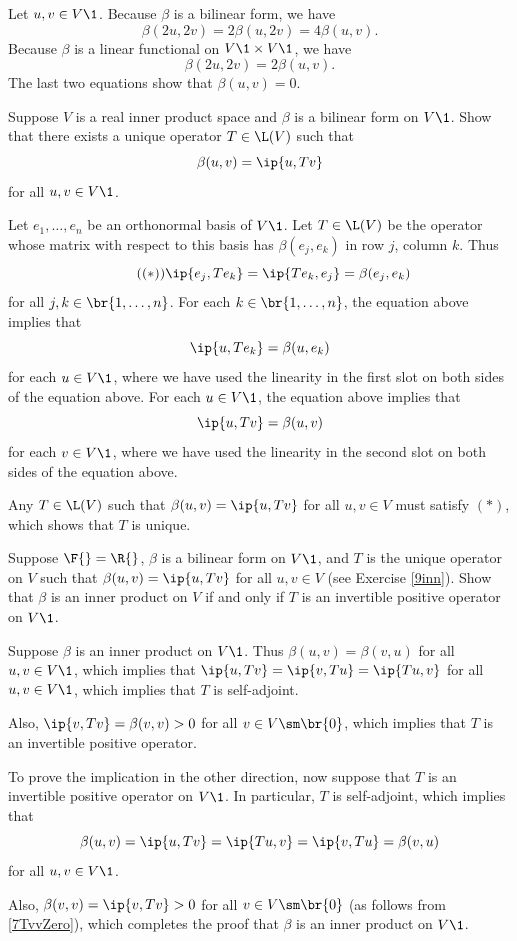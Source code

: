 \begin{Solution}
Let $u, v \in V\1$. Because $\beta$ is a bilinear form, we have
\[
\beta(2u, 2v) = 2 \beta(u, 2v) = 4 \beta(u, v).
\]
Because $\beta$ is a linear functional on $V\1 \times V\1$, we have
\[
\beta(2u, 2v) = 2 \beta(u, v).
\]
The last two equations show that $\beta(u, v) = 0$.
\end{Solution}

\exercise
Suppose $V$ is a real inner product space and $\beta$ is a bilinear form on $V\1$. Show that there exists a unique operator $T \in \L(V)$ such that\label{9inn}
\[
\beta(u, v) = \ip{u,Tv}
\]
for all $u, v \in V\1$.

\begin{Solution}
Let $e_1, \ldots, e_n$ be an orthonormal basis of $V\1$. Let $T \in \L(V)$ be the operator whose matrix with respect to this basis has $\beta(e_j, e_k)$ in row $j$, column $k$. Thus
\[ \tag{$(*)$}
\ip{e_j, Te_k} = \ip{Te_k, e_j} = \beta(e_j, e_k)
\]
for all $j, k \in \br{1, \ldots, n}$. For each $k \in \br{1, \ldots, n}$, the equation above implies that
\[
\ip{u, Te_k} = \beta(u, e_k)
\]
for each $u \in V\1$, where we have used the linearity in the first slot on both sides of the equation above. For each $u \in V\1$, the equation above implies that
\[
\ip{u, Tv} = \beta(u,v)
\]
for each $v \in V\1$, where we have used the linearity in the second slot on both sides of the equation above.

Any $T \in \L(V)$ such that $\beta(u, v) = \ip{u,Tv}$ for all $u,v \in V$ must satisfy $(*)$, which shows that $T$ is unique.
\end{Solution}

\exercise
Suppose $\F{} = \R{}$, $\beta$ is a bilinear form on $V\1$, and $T$ is the unique operator on $V$ such that $\beta(u,v) = \ip{u, Tv}$ for all $u, v \in V$ (see Exercise \ref{9inn}). Show that $\beta$ is an inner product on $V$ if and only if $T$ is an invertible positive operator on $V\1$.

\begin{Solution}
Suppose $\beta$ is an inner product on $V\1$. Thus $\beta(u,v) = \beta(v,u)$ for all $u, v \in V\1$, which implies that
$\ip{u,Tv} = \ip{v, Tu} = \ip{Tu,v}$ for all $u, v \in V\1$, which implies that $T$ is self-adjoint.

Also, $\ip{v, Tv} = \beta(v, v) > 0$ for all $v \in V \sm \br{0}$, which implies that $T$ is an invertible positive operator.

To prove the implication in the other direction, now suppose that $T$ is an invertible positive operator on $V\1$. In particular, $T$ is self-adjoint, which implies that
\[
\beta(u,v) = \ip{u,Tv} = \ip{Tu, v} = \ip{v, Tu} = \beta(v,u)
\]
for all $u, v \in V\1$.

Also, $\beta(v,v) = \ip{v, Tv} > 0$ for all $v \in V \sm \br{0}$ (as follows from \ref{7TvvZero}), which completes the proof that $\beta$ is an inner product on $V\1$.
\end{Solution}

